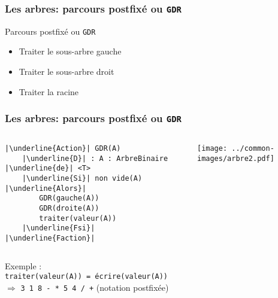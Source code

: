 \documentclass[table,handout,tikz,12pt,svgnames]{beamer}
\begin{document}
\begin{frame}[fragile=singleslide]
	\frametitle{Les arbres: parcours postfixé ou \texttt{GDR}}
	\begin{block}{Parcours postfixé ou \texttt{GDR}}
		\begin{itemize}
			\item Traiter le sous-arbre gauche
			\item Traiter le sous-arbre droit
			\item Traiter la racine
		\end{itemize}
	\end{block}
\end{frame}


\begin{frame}[fragile=singleslide]
	\frametitle{Les arbres: parcours postfixé ou \texttt{GDR}}
	\begin{block}{}
		\begin{columns}[T]
			\begin{column}{0.7\textwidth}
				\begin{verbatim}
|\underline{Action}| GDR(A)
	|\underline{D}| : A : ArbreBinaire |\underline{de}| <T>
	|\underline{Si}| non vide(A) |\underline{Alors}|
		GDR(gauche(A))
		GDR(droite(A))
		traiter(valeur(A))
	|\underline{Fsi}|
|\underline{Faction}|
				\end{verbatim}
			\end{column}
			\hspace{-2.5cm}
			\hspace{0.2cm}
			\begin{column}{0.38\textwidth}
				\begin{flushright}
					{\texttt{[image: ../common-images/arbre2.pdf]}}
				\end{flushright}
			\end{column}
		\end{columns}
		\vspace{0.5cm}
		Exemple :\\ \texttt{traiter(valeur(A)) = écrire(valeur(A))}\\
		$\Rightarrow$ \texttt{3 1 8 - * 5 4 / +} (notation postfixée)
	\end{block}
\end{frame}
\end{document}
